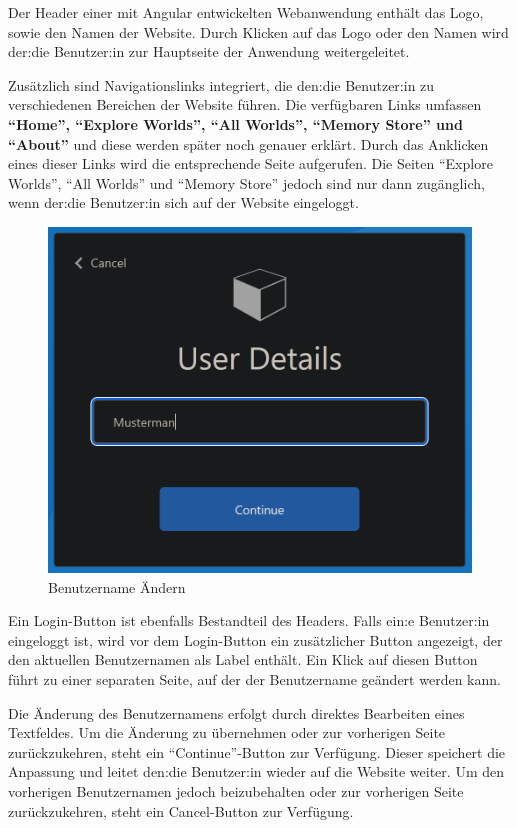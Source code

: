 Der Header einer mit Angular entwickelten Webanwendung enthält das Logo, sowie den Namen der Website. Durch Klicken auf das Logo oder den Namen wird der:die Benutzer:in zur Hauptseite der Anwendung weitergeleitet.

Zusätzlich sind Navigationslinks integriert, die den:die Benutzer:in zu verschiedenen Bereichen der Website führen. Die verfügbaren Links umfassen \textbf{``Home'', ``Explore Worlds'', ``All Worlds'', ``Memory Store'' und ``About''} und diese werden später noch genauer erklärt. Durch das Anklicken eines dieser Links wird die entsprechende Seite aufgerufen. Die Seiten ``Explore Worlds'', ``All Worlds'' und ``Memory Store'' jedoch sind nur dann zugänglich, wenn der:die Benutzer:in sich auf der Website eingeloggt.


\begin{figure} [h t]
    \centering
    \includegraphics[scale=0.4]{pics/benutzername_aendern.PNG}
    \caption{Benutzername Ändern}
    \label{fig:benutzername-aendern}
\end{figure}

Ein Login-Button ist ebenfalls Bestandteil des Headers. Falls ein:e Benutzer:in eingeloggt ist, wird vor dem Login-Button ein zusätzlicher Button angezeigt, der den aktuellen Benutzernamen als Label enthält. Ein Klick auf diesen Button führt zu einer separaten Seite, auf der der Benutzername geändert werden kann.

Die Änderung des Benutzernamens erfolgt durch direktes Bearbeiten eines Textfeldes. Um die Änderung zu übernehmen oder zur vorherigen Seite zurückzukehren, steht ein ``Continue''-Button zur Verfügung. Dieser speichert die Anpassung und leitet den:die Benutzer:in wieder auf die Website weiter. Um den vorherigen Benutzernamen jedoch beizubehalten oder zur vorherigen Seite zurückzukehren, steht ein Cancel-Button zur Verfügung. 

